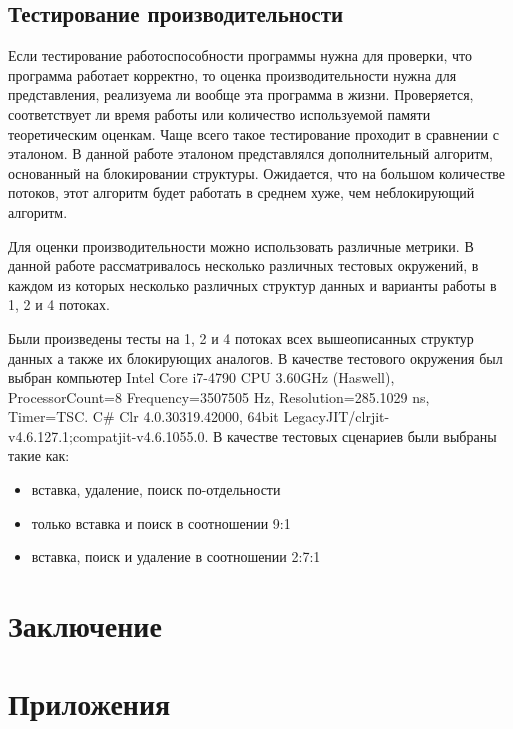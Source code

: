 \documentclass[12pt]{article}
\begin{document}
{				\subsection{Тестирование производительности}
					\par Если тестирование работоспособности программы нужна для проверки, что программа работает корректно, то оценка производительности нужна для представления, реализуема ли вообще эта программа в жизни. Проверяется, соответствует ли время работы или количество используемой памяти теоретическим оценкам. Чаще всего такое тестирование проходит в сравнении с эталоном. В данной работе эталоном представлялся дополнительный алгоритм, основанный на блокировании структуры. Ожидается, что на большом количестве потоков, этот алгоритм будет работать в среднем хуже, чем неблокирующий алгоритм.
					\par Для оценки производительности можно использовать различные метрики. В данной работе рассматривалось несколько различных тестовых окружений, в каждом из которых несколько различных структур данных и варианты работы в 1, 2 и 4 потоках. 
					\par Были произведены тесты на 1, 2 и 4 потоках всех вышеописанных структур данных а также их блокирующих аналогов. В качестве тестового окружения был выбран компьютер Intel Core i7-4790 CPU 3.60GHz (Haswell), ProcessorCount=8 Frequency=3507505 Hz, Resolution=285.1029 ns, Timer=TSC. C\# Clr 4.0.30319.42000, 64bit LegacyJIT/clrjit-v4.6.127.1;compatjit-v4.6.1055.0.
					В качестве тестовых сценариев были выбраны такие как: 
					\begin{itemize}
						\item вставка, удаление, поиск по-отдельности
						\item только вставка и поиск в соотношении 9:1
						\item вставка, поиск и удаление в соотношении 2:7:1			
					\end{itemize}
				
				
		\newpage
		
		\section{Заключение}
		
		\newpage
			
			  
		
		\newpage
		
		\section{Приложения}
	}
	
\end{document}
